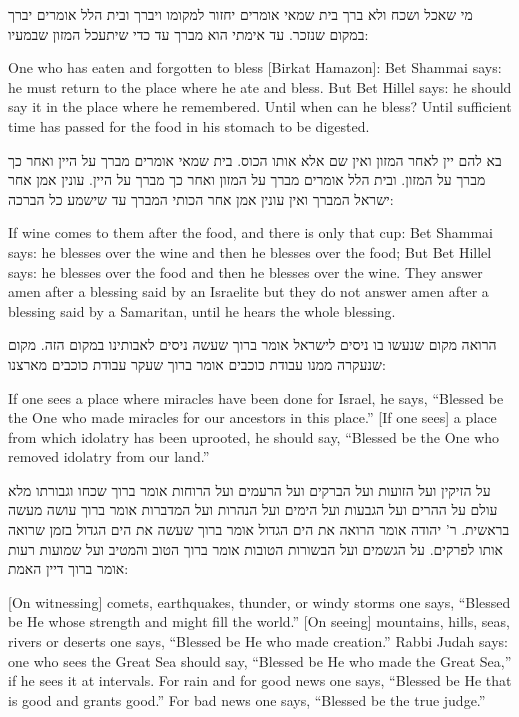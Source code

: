 \documentclass[12pt, openany]{book}
\newcommand{\textblock}[2]{
	{\fontsize{16pt}{20pt}\selectfont #1\\}
	
	\begin{english}
		#2
	\end{english}
	\clearpage
}
\begin{document}
\textblock{מי שאכל ושכח ולא ברך בית שמאי אומרים יחזור למקומו ויברך ובית הלל אומרים יברך במקום שנזכר. עד אימתי הוא מברך עד כדי שיתעכל המזון שבמעיו: }{One who has eaten and forgotten to bless {[Birkat Hamazon]}: Bet Shammai says: he must return to the place where he ate and bless. But Bet Hillel says:  he should say it in the place where he remembered. Until when can he bless? Until sufficient time has passed for the food in his stomach to be digested.}
\textblock{בא להם יין לאחר המזון ואין שם אלא אותו הכוס. בית שמאי אומרים מברך על היין ואחר כך מברך על המזון. ובית הלל אומרים מברך על המזון ואחר כך מברך על היין. עונין אמן אחר ישראל המברך ואין עונין אמן אחר הכותי המברך עד שישמע כל הברכה: }{If wine comes to them after the food, and there is only that cup: Bet Shammai says: he blesses over the wine and then he blesses over the food; But Bet Hillel says: he blesses over the food and then he blesses over the wine. They answer amen after a blessing said by an Israelite but they do not answer amen after a blessing said by a Samaritan, until he hears the whole blessing.}
\textblock{הרואה מקום שנעשו בו ניסים לישראל אומר ברוך שעשה ניסים לאבותינו במקום הזה. מקום שנעקרה ממנו עבודת כוכבים אומר ברוך שעקר עבודת כוכבים מארצנו: }{If one sees a place where miracles have been done for Israel, he says, “Blessed be the One who made miracles for our ancestors in this place.” {[If one sees]} a place from which idolatry has been uprooted, he should say, “Blessed be the One who removed idolatry from our land.”}
\textblock{על הזיקין ועל הזועות ועל הברקים ועל הרעמים ועל הרוחות אומר ברוך שכחו וגבורתו מלא עולם על ההרים ועל הגבעות ועל הימים ועל הנהרות ועל המדברות אומר ברוך עושה מעשה בראשית. ר' יהודה אומר הרואה את הים הגדול אומר ברוך שעשה את הים הגדול בזמן שרואה אותו לפרקים. על הגשמים ועל הבשורות הטובות אומר ברוך הטוב והמטיב ועל שמועות רעות אומר ברוך דיין האמת: }{{[On witnessing]} comets, earthquakes, thunder, or windy storms one says, “Blessed be He whose strength and might fill the world.” {[On seeing]} mountains, hills, seas, rivers or deserts one says, “Blessed be He who made creation.” Rabbi Judah says: one who sees the Great Sea should say, “Blessed be He who made the Great Sea,” if he sees it at intervals. For rain and for good news one says, “Blessed be He that is good and grants good.” For bad news one says, “Blessed be the true judge.”}
\end{document}
